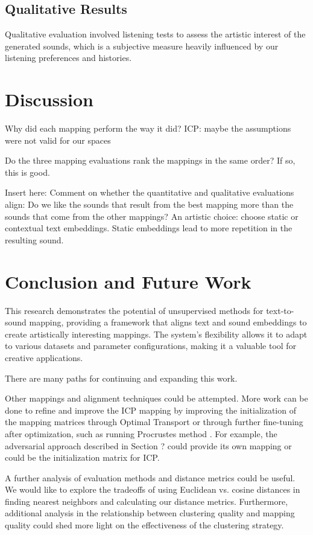 \documentclass[twoside,a4paper]{article}
\begin{document}
\subsection{Qualitative Results}
Qualitative evaluation involved listening tests to assess the artistic interest of the generated sounds, which is a subjective measure heavily influenced by our listening preferences and histories. 

\section{Discussion}

Why did each mapping perform the way it did? 
ICP: maybe the assumptions were not valid for our spaces

Do the three mapping evaluations rank the mappings in the same order? If so, this is good.

Insert here: Comment on whether the quantitative and qualitative evaluations align: Do we like the sounds that result from the best mapping more than the sounds that come from the other mappings? An artistic choice: choose static or contextual text embeddings. Static embeddings lead to more repetition in the resulting sound.

\section{Conclusion and Future Work}
This research demonstrates the potential of unsupervised methods for text-to-sound mapping, providing a framework that aligns text and sound embeddings to create artistically interesting mappings. The system's flexibility allows it to adapt to various datasets and parameter configurations, making it a valuable tool for creative applications.

There are many paths for continuing and expanding this work. 

Other mappings and alignment techniques could be attempted. More work can be done to refine and improve the ICP mapping by improving the initialization of the mapping matrices through Optimal Transport or through further fine-tuning after optimization, such as running Procrustes method \cite{Hoshen:18}. For example, the adversarial approach described in Section ? could provide its own mapping or could be the initialization matrix for ICP.

A further analysis of evaluation methods and distance metrics could be useful. We would like to explore the tradeoffs of using Euclidean vs. cosine distances in finding nearest neighbors and calculating our distance metrics. Furthermore, additional analysis in the relationship between clustering quality and mapping quality could shed more light on the effectiveness of the clustering strategy. 
\end{document}
